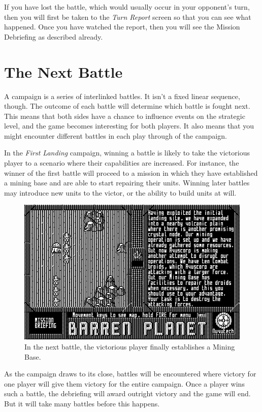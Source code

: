 If you have lost the battle, which would usually occur in your opponent's turn, then you will first be taken to the {\it Turn Report} screen so that you can see what happened. Once you have watched the report, then you will see the Mission Debriefing as described already.

\section{The Next Battle}

\noindent
A campaign is a series of interlinked battles. It isn't a fixed linear sequence, though. The outcome of each battle will determine which battle is fought next. This means that both sides have a chance to influence events on the strategic level, and the game becomes interesting for both players. It also means that you might encounter different battles in each play through of the campaign.

In the {\it First Landing} campaign, winning a battle is likely to take the victorious player to a scenario where their capabilities are increased. For instance, the winner of the first battle will proceed to a mission in which they have established a mining base and are able to start repairing their units. Winning later battles may introduce new units to the victor, or the ability to build units at will.

\begin{figure}[h]
  \includegraphics[width=\textwidth]{second-scenario}
  \caption{In the next battle, the victorious player finally
    establishes a Mining Base.}
\end{figure}

As the campaign draws to its close, battles will be encountered where victory for one player will give them victory for the entire campaign. Once a player wins such a battle, the debriefing will award outright victory and the game will end. But it will take many battles before this happens.
